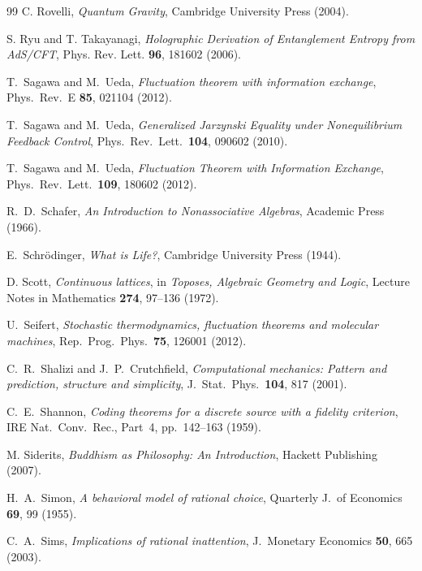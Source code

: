\documentclass[12pt,a4paper,openany]{book}
\begin{document}
\begin{thebibliography}{99}
C. Rovelli, \emph{Quantum Gravity}, Cambridge University Press (2004).

S. Ryu and T. Takayanagi, \emph{Holographic Derivation of Entanglement Entropy from AdS/CFT}, Phys. Rev. Lett. \textbf{96}, 181602 (2006).

T.~Sagawa and M.~Ueda, \emph{Fluctuation theorem with information exchange}, Phys.\ Rev.\ E \textbf{85}, 021104 (2012).

T.~Sagawa and M.~Ueda,
\emph{Generalized Jarzynski Equality under Nonequilibrium Feedback Control},
Phys.\ Rev.\ Lett.\ \textbf{104}, 090602 (2010).

T.~Sagawa and M.~Ueda,
\emph{Fluctuation Theorem with Information Exchange},
Phys.\ Rev.\ Lett.\ \textbf{109}, 180602 (2012).

R.~D.~Schafer, \emph{An Introduction to Nonassociative Algebras}, Academic Press (1966).

E.~Schr\"odinger,
\emph{What is Life?},
Cambridge University Press (1944).

D. Scott, \emph{Continuous lattices}, in \emph{Toposes, Algebraic Geometry and Logic}, Lecture Notes in Mathematics \textbf{274}, 97--136 (1972).

U.~Seifert, \emph{Stochastic thermodynamics, fluctuation theorems and molecular machines}, Rep.\ Prog.\ Phys.\ \textbf{75}, 126001 (2012).

C.~R.~Shalizi and J.~P.~Crutchfield,
\emph{Computational mechanics: Pattern and prediction, structure and simplicity},
J.\ Stat.\ Phys.\ \textbf{104}, 817 (2001).

C.~E.~Shannon,
\emph{Coding theorems for a discrete source with a
fidelity criterion},
IRE Nat.\ Conv.\ Rec., Part~4, pp.~142--163 (1959).

M. Siderits, \emph{Buddhism as Philosophy: An Introduction}, Hackett Publishing (2007).


H.~A.~Simon,
\emph{A behavioral model of rational choice},
Quarterly J.\ of Economics \textbf{69}, 99 (1955).

C.~A.~Sims,
\emph{Implications of rational inattention},
J.\ Monetary Economics \textbf{50}, 665 (2003).


\end{thebibliography}
\end{document}
